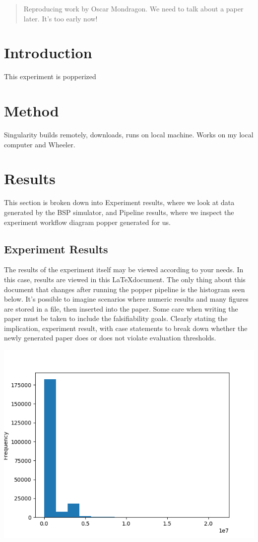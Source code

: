 \documentclass[12pt]{article}
\begin{document}
\maketitle

\begin{abstract}
Reproducing work by Oscar Mondragon. We need to talk about a paper later. It's too early now!
\end{abstract}

\section*{Introduction}
This experiment is popperized
\section*{Method}
Singularity builds remotely, downloads, runs on local machine. Works on my local computer and Wheeler.
\section*{Results}
This section is broken down into Experiment results, where we look at data generated by the BSP simulator, and Pipeline results, where we inspect the experiment workflow diagram popper generated for us.
\subsection*{Experiment Results}
The results of the experiment itself may be viewed according to your needs. In this case, results are viewed in this \LaTeX document. The only thing about this document that changes after running the popper pipeline is the histogram seen below. It's possible to imagine scenarios where numeric results and many figures are stored in a file, then inserted into the paper. Some care when writing the paper must be taken to include the falsifiability goals. Clearly stating the implication, experiment result, with case statements to break down whether the newly generated paper does or does not violate evaluation thresholds.

\begin{center}
\includegraphics[scale=0.5]{../all_sample_hist.png} 
\end{center}
\end{document}
